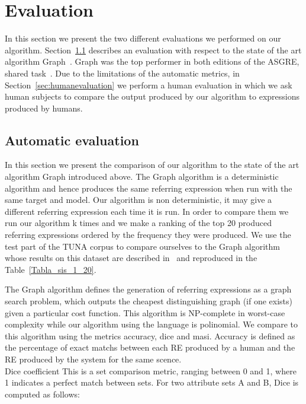 \section{Evaluation} \label{sec:evaluation}

In this section we present the two different evaluations we performed on our algorithm. Section~\ref{sec:automaticevaluation} describes an evaluation with respect to the state of the art algorithm Graph~\cite{KrahmerGRAPH}. Graph was the top performer in both editions of the ASGRE, shared task~\cite{gatt-balz-kow:2008:ENLG}. Due to the limitations of the automatic metrics, in Section~\ref{sec:humanevaluation} we perform a human evaluation in  which we ask human subjects to compare the output produced by our algorithm to expressions produced by humans. 
  

\subsection{Automatic evaluation} \label{sec:automaticevaluation}

In this section we present the comparison of our algorithm to the state of the art algorithm Graph introduced above. The Graph algorithm is a deterministic algorithm and hence produces the same referring expression when run with the same target and model. Our algorithm is non deterministic, it may give a different referring expression each time it is run. In order to compare them we run our algorithm k times and we make a ranking of the top 20 produced referring expressions ordered by the frequency they were produced. We use the test part of the TUNA corpus to compare ourselves to the Graph algorithm whose results on this dataset are described in~\cite{KrahmerGRAPH} and reproduced in the Table~\ref{Tabla_sis_1_20}. 

The Graph algorithm defines the generation of referring expressions as a graph search problem, which outputs the cheapest distinguishing graph (if one exists) given a particular cost function. This algorithm is NP-complete in worst-case complexity while our algorithm using the \el language is polinomial. We compare to this algorithm using the metrics accuracy, dice and masi. Accuracy is defined as the percentage of exact matchs between each RE produced by a human and the RE produced by the system for the same scence. \\

Dice coefficient 
This is a set comparison metric, ranging between 0 and 1, where
1 indicates a perfect match between sets. For two
attribute sets A and B, Dice is computed as follows:\\

